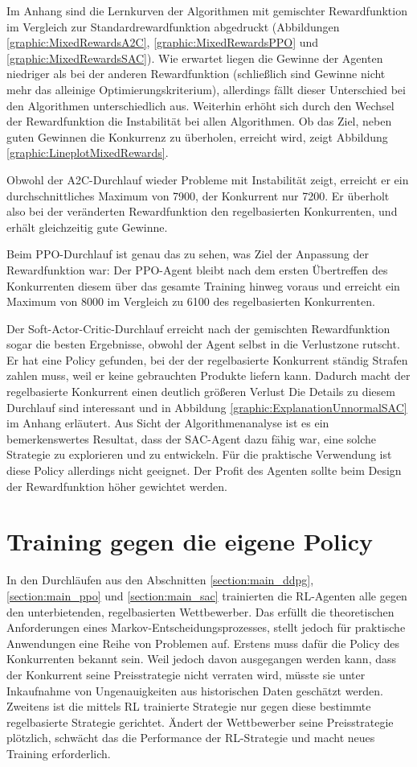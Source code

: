 Im Anhang sind die Lernkurven der Algorithmen mit gemischter Rewardfunktion im Vergleich zur Standardrewardfunktion abgedruckt (Abbildungen \ref{graphic:MixedRewardsA2C}, \ref{graphic:MixedRewardsPPO} und \ref{graphic:MixedRewardsSAC}).
Wie erwartet liegen die Gewinne der Agenten niedriger als bei der anderen Rewardfunktion (schließlich sind Gewinne nicht mehr das alleinige Optimierungskriterium), allerdings fällt dieser Unterschied bei den Algorithmen unterschiedlich aus.
Weiterhin erhöht sich durch den Wechsel der Rewardfunktion die Instabilität bei allen Algorithmen.
Ob das Ziel, neben guten Gewinnen die Konkurrenz zu überholen, erreicht wird, zeigt Abbildung \ref{graphic:LineplotMixedRewards}.

Obwohl der A2C-Durchlauf wieder Probleme mit Instabilität zeigt, erreicht er ein durchschnittliches Maximum von 7900, der Konkurrent nur 7200.
Er überholt also bei der veränderten Rewardfunktion den regelbasierten Konkurrenten, und erhält gleichzeitig gute Gewinne.

Beim PPO-Durchlauf ist genau das zu sehen, was Ziel der Anpassung der Rewardfunktion war:
Der PPO-Agent bleibt nach dem ersten Übertreffen des Konkurrenten diesem über das gesamte Training hinweg voraus und erreicht ein Maximum von 8000 im Vergleich zu 6100 des regelbasierten Konkurrenten.

Der Soft-Actor-Critic-Durchlauf erreicht nach der gemischten Rewardfunktion sogar die besten Ergebnisse, obwohl der Agent selbst in die Verlustzone rutscht.
Er hat eine Policy gefunden, bei der der regelbasierte Konkurrent ständig Strafen zahlen muss, weil er keine gebrauchten Produkte liefern kann.
Dadurch macht der regelbasierte Konkurrent einen deutlich größeren Verlust
Die Details zu diesem Durchlauf sind interessant und in Abbildung \ref{graphic:ExplanationUnnormalSAC} im Anhang erläutert.
Aus Sicht der Algorithmenanalyse ist es ein bemerkenswertes Resultat, dass der SAC-Agent dazu fähig war, eine solche Strategie zu explorieren und zu entwickeln.
Für die praktische Verwendung ist diese Policy allerdings nicht geeignet.
Der Profit des Agenten sollte beim Design der Rewardfunktion höher gewichtet werden.

\section{Training gegen die eigene Policy}
\label{section:self_play}
In den Durchläufen aus den Abschnitten \ref{section:main_ddpg}, \ref{section:main_ppo} und \ref{section:main_sac} trainierten die RL-Agenten alle gegen den unterbietenden, regelbasierten Wettbewerber.
Das erfüllt die theoretischen Anforderungen eines Markov-Entscheidungsprozesses, stellt jedoch für praktische Anwendungen eine Reihe von Problemen auf.
Erstens muss dafür die Policy des Konkurrenten bekannt sein.
Weil jedoch davon ausgegangen werden kann, dass der Konkurrent seine Preisstrategie nicht verraten wird, müsste sie unter Inkaufnahme von Ungenauigkeiten aus historischen Daten geschätzt werden.
Zweitens ist die mittels RL trainierte Strategie nur gegen diese bestimmte regelbasierte Strategie gerichtet.
Ändert der Wettbewerber seine Preisstrategie plötzlich, schwächt das die Performance der RL-Strategie und macht neues Training erforderlich.

